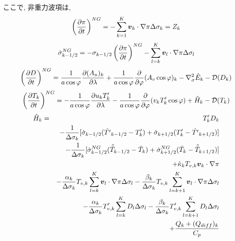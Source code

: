 ここで, 非重力波項は,
%
\begin{equation}
  \label{Z項}
  \left( \frac{\partial \pi}{\partial t} \right)^{NG}
   =   - \sum_{k=1}^{K} \Dvect{v}_{k} \cdot \nabla \pi  
       \Delta  \sigma_{k} \nonumber \\
   =   Z_{k}
\end{equation}
%
\begin{equation}
  \dot{\sigma}^{NG}_{k-1/2}
 = - \sigma_{k-1/2} \left( \frac{\partial \pi}{\partial t} \right)^{NG}
   - \sum_{l=k}^{K} \Dvect{v}_{l} \cdot \nabla \pi
       \Delta  \sigma_{l}
\end{equation}
%
\begin{equation}
  \left( \frac{\partial D}{\partial t} \right)^{NG}
       =   \frac{1}{a\cos\varphi}
            \frac{\partial (A_u)_{k}}{\partial \lambda}
          + \frac{1}{a\cos\varphi}
            \frac{\partial }{\partial \varphi} (A_v \cos\varphi)_k
          - \nabla^{2}_{\sigma} \hat{E}_{k} 
          - {\cal D}(D_{k}) 
\end{equation}
%
\begin{equation}
  \left( \frac{\partial T_{k}}{\partial t} \right)^{NG} 
      =   - \frac{1}{a\cos\varphi} 
               \frac{\partial u_k T'_k}{\partial \lambda}
          - \frac{1}{a\cos\varphi}
               \frac{\partial }{\partial \varphi} (v_k T'_k \cos\varphi)
          + \hat{H}_{k} 
          - {\cal D}(T_{k}) 
\end{equation}
%
\begin{eqnarray}
 \hat{H}_k & = & T_{k}^{\prime} D_{k} \nonumber \\
     &   & - \frac{1}{\Delta \sigma_{k}} 
             [   \dot{\sigma}_{k-1/2} ( \hat{T^{\prime}}_{k-1/2} 
                                         - T^{\prime}_{k}   )
               + \dot{\sigma}_{k+1/2} ( T^{\prime}_{k}  
                                         - \hat{T^{\prime}}_{k+1/2} ) ]
               \nonumber \\
     &   & - \frac{1}{\Delta \sigma_{k}} 
             [   \dot{\sigma}^{NG}_{k-1/2} ( \hat{\bar{T}}_{k-1/2} 
                                         - \bar{T}_{k}   )
               + \dot{\sigma}^{NG}_{k+1/2} ( \bar{T}_{k}  
                                         - \hat{\bar{T}}_{k+1/2} ) ]
               \nonumber \\
     &   & + \hat{\kappa}_{k} T_{v,k} \Dvect{v}_{k} \cdot \nabla \pi
               \nonumber \\
     &   & - \frac{\alpha_{k}}{\Delta \sigma_{k} } T_{v,k}
             \sum_{l=k}^{K} \Dvect{v}_{l} \cdot \nabla \pi 
               \Delta \sigma_{l}
           - \frac{\beta_{k}}{\Delta \sigma_{k} } T_{v,k}
             \sum_{l=k+1}^{K} \Dvect{v}_{l} \cdot \nabla \pi 
               \Delta \sigma_{l}
               \nonumber \\
     &   & - \frac{\alpha_{k}}{\Delta \sigma_{k} } T'_{v,k}
             \sum_{l=k}^{K} D_l  \Delta \sigma_{l}
           - \frac{\beta_{k}}{\Delta \sigma_{k} } T'_{v,k}
             \sum_{l=k+1}^{K} D_l  \Delta \sigma_{l}
               \nonumber \\
     &   & + \frac{Q_k + (Q_{diff})_k}{C_p}
\end{eqnarray}
